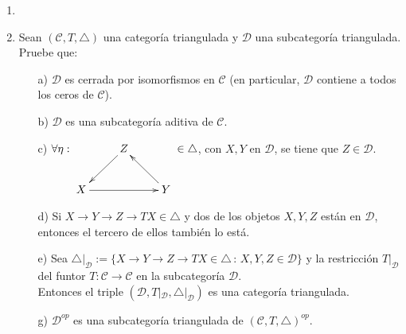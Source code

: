 \documentclass{article}
\newcommand{\cc}{\mathscr{C}}
\begin{document}
\begin{enumerate}
\begin{proof}
\begin{small}
\begin{align*}
([-T^{-1}v,T^{-1}C] \circ Hom_{\cc}(T^{-1}h,T^{-1}C))(1_{T^{-1}C}) =& ([-T^{-1}v,T^{-1}C] \circ Hom_{\cc}(T^{-1}h',T^{-1}C))(1_{T^{-1}C})\\
Hom_{\cc}(T^{-1}h,T^{-1}C))(1_{T^{-1}C})(1_{T^{-1}C}) =& Hom_{\cc}(T^{-1}h',T^{-1}C))(1_{T^{-1}C})(1_{T^{-1}C}) \\
T^{-1}h =& T^{-1}h'\\
h =& h'
\end{align*}
\end{small}
donde $[-T^{-1}v,T^{-1}C]=Hom_{\cc}(-T^{-1}v,T^{-1}C)$. 

\end{proof}

\item
\item Sean $(\mathscr{C},T,\triangle)$ una categoría triangulada y $\mathscr{D}$ una subcategoría triangulada. Pruebe que:
\begin{itemize}
\item[a)] $\mathscr{D}$ es cerrada por isomorfismos en $\mathscr{C}$ (en particular, $\mathscr{D}$ contiene a todos los ceros de $\mathscr{C}$).

\item[b)] $\mathscr{D}$ es una subcategoría aditiva de  $\mathscr{C}$.

\item[c)] $\forall \eta:\xymatrix{&Z\ar[ld]&\\ X\ar[rr] & &Y\ar[ul]}\in \triangle $, con $X,Y$ en $\mathscr{D}$, se tiene que $Z\in \mathscr{D}$.

\item[d)] Si $X\to Y\to Z\to TX \in \triangle$ y dos de los objetos $X,Y,Z$ están en $\mathscr{D}$, entonces el tercero de ellos también lo está.

\item[e)] Sea $\triangle|_\mathscr{D}:=\{X\to Y\to Z\to TX \in \triangle\,:\, X,Y,Z\in \mathscr{D}\}$ y la
restricción $T|_\mathscr{D}$ del funtor $T:\mathscr{C}\to\mathscr{C}$ en la subcategoría $\mathscr{D}$.\\
Entonces el triple $(\mathscr{D},T|_\mathscr{D},\triangle|_\mathscr{D})$ es una categoría triangulada.

\item[g)] $\mathscr{D}^{op}$ es una subcategoría triangulada de $(\mathscr{C},T,\triangle)^{op}$.
\end{itemize}


\end{enumerate}
\end{document}

